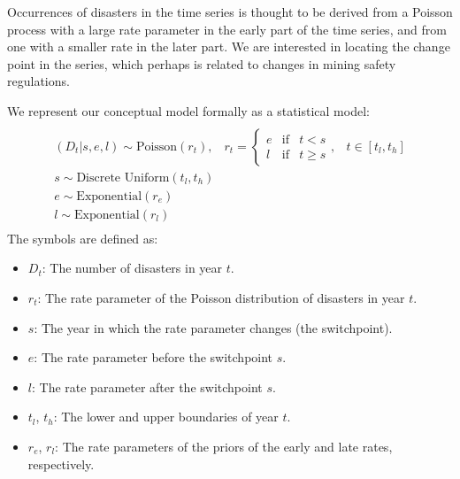 \documentclass[letterpaper,10pt,english]{sphinxmanual}
\begin{document}
Occurrences of disasters in the time series is thought to be derived from a Poisson process with a large rate parameter in the early part of the time series, and from one with a smaller rate in the later part. We are interested in locating the change point in the series, which perhaps is related to changes in mining safety regulations.

We represent our conceptual model formally as a statistical model:
\label{tutorial:equation-disaster_model}\begin{gather}
\begin{split}     \begin{array}{ccc}  (D_t | s, e, l) \sim\text{Poisson}\left(r_t\right), & r_t=\left\{\begin{array}{lll}             e &\text{if}& t< s\\ l &\text{if}& t\ge s             \end{array}\right.,&t\in[t_l,t_h]\\         s\sim \text{Discrete Uniform}(t_l, t_h)\\         e\sim \text{Exponential}(r_e)\\         l\sim \text{Exponential}(r_l)     \end{array}\end{split}\label{tutorial-disaster_model}
\end{gather}
The symbols are defined as:
\begin{itemize}
\item {} 
$D_t$: The number of disasters in year $t$.

\item {} 
$r_t$: The rate parameter of the Poisson distribution of disasters in year $t$.

\item {} 
$s$: The year in which the rate parameter changes (the switchpoint).

\item {} 
$e$: The rate parameter before the switchpoint $s$.

\item {} 
$l$: The rate parameter after the switchpoint $s$.

\item {} 
$t_l$, $t_h$: The lower and upper boundaries of year $t$.

\item {} 
$r_e$, $r_l$: The rate parameters of the priors of the early and late rates, respectively.

\end{itemize}
\end{document}

